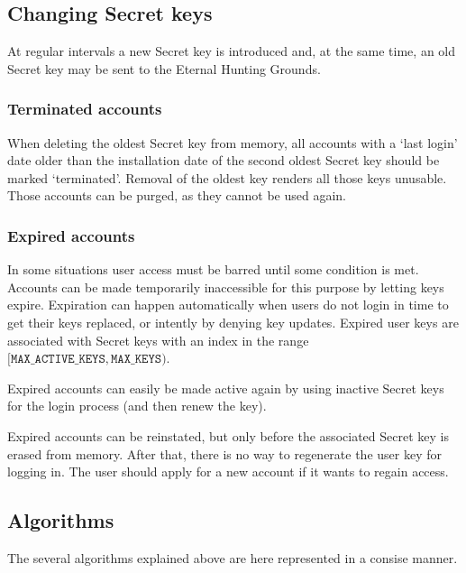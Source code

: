 \subsection{Changing Secret keys}
At regular intervals a new Secret key is introduced and,
at the same time,
an old Secret key may be sent to the Eternal Hunting Grounds.

\subsubsection{Terminated accounts}
When deleting the oldest Secret key from memory,
all accounts with a `last login' date older than the installation
date of the second oldest Secret key should be marked `terminated'.
Removal of the oldest key renders all those keys unusable.
Those accounts can be purged, as they cannot be used again.

\subsubsection{Expired accounts}
In some situations user access must be barred until some condition is met.
Accounts can be made temporarily inaccessible for this purpose by letting keys expire.
Expiration can happen automatically when users do not login in time to get their keys replaced,
or intently by denying key updates.
Expired user keys are associated with Secret keys with an index in the range $[\texttt{MAX\_ACTIVE\_KEYS},\texttt{MAX\_KEYS})$.
\par
Expired accounts can easily be made active again by using inactive Secret keys for the login process (and then renew the key).
\par
Expired accounts can be reinstated,
but only before the associated Secret key is erased from memory.
After that, there is no way to regenerate the user key for logging in.
The user should apply for a new account if it wants to regain access.

\subsection{Algorithms}
The several algorithms explained above are here represented in a consise manner.
